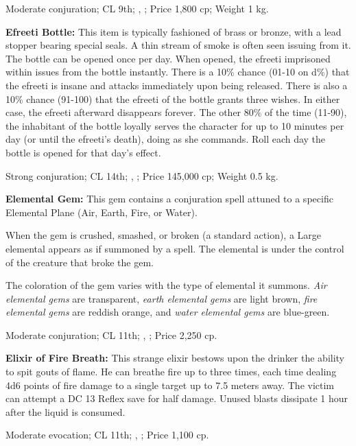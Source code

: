 Moderate conjuration; CL 9th; , ; Price 1,800 cp; Weight 1 kg.



\textbf{Efreeti Bottle:} This item is typically fashioned of brass or bronze, with a lead stopper bearing special seals. A thin stream of smoke is often seen issuing from it. The bottle can be opened once per day. When opened, the efreeti imprisoned within issues from the bottle instantly. There is a 10\% chance (01-10 on d\%) that the efreeti is insane and attacks immediately upon being released. There is also a 10\% chance (91-100) that the efreeti of the bottle grants three wishes. In either case, the efreeti afterward disappears forever. The other 80\% of the time (11-90), the inhabitant of the bottle loyally serves the character for up to 10 minutes per day (or until the efreeti's death), doing as she commands. Roll each day the bottle is opened for that day's effect.

Strong conjuration; CL 14th; , ; Price 145,000 cp; Weight 0.5 kg.



\textbf{Elemental Gem:} This gem contains a conjuration spell attuned to a specific Elemental Plane (Air, Earth, Fire, or Water).

When the gem is crushed, smashed, or broken (a standard action), a Large elemental appears as if summoned by a  spell. The elemental is under the control of the creature that broke the gem.

The coloration of the gem varies with the type of elemental it summons. \emph{Air elemental gems} are transparent, \emph{earth elemental gems} are light brown, \emph{fire elemental gems} are reddish orange, and \emph{water elemental gems} are blue-green.

Moderate conjuration; CL 11th; , ; Price 2,250 cp.



\textbf{Elixir of Fire Breath:} This strange elixir bestows upon the drinker the ability to spit gouts of flame. He can breathe fire up to three times, each time dealing 4d6 points of fire damage to a single target up to 7.5 meters away. The victim can attempt a DC 13 Reflex save for half damage. Unused blasts dissipate 1 hour after the liquid is consumed.

Moderate evocation; CL 11th; , ; Price 1,100 cp.



